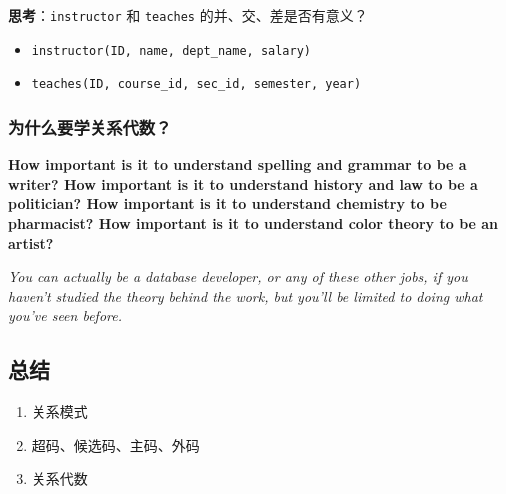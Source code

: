 \documentclass[aspectratio=169, 14pt]{beamer}
\begin{document}
\begin{frame}

    {\large {}} \textbf{思考}：\texttt{instructor} 和 \texttt{teaches} 的并、交、差是否有意义？ 

    \begin{itemize}
        \item \texttt{instructor(ID, name, dept\_name, salary)}
        \item \texttt{teaches(ID, course\_id, sec\_id, semester, year)}
    \end{itemize}  
\pause
{} 
\end{frame}

\begin{frame}
    \frametitle{为什么要学关系代数？}    
    \textbf{How important is it to understand spelling and grammar to be a writer? How important is it to understand history and law to be a politician? How important is it to understand chemistry to be pharmacist? How important is it to understand color theory to be an artist?}

    \emph{You can actually be a database developer, or any of these other jobs, if you haven't studied the theory behind the work, but you'll be limited to doing what you've seen before.}

\end{frame}

\begin{frame}
    \section{\textcolor{darkmidnightblue}{总结}} 
\begin{enumerate}
    \item 关系模式
    \item 超码、候选码、主码、外码
    \item 关系代数
\end{enumerate}    

\end{frame}
\end{document}
